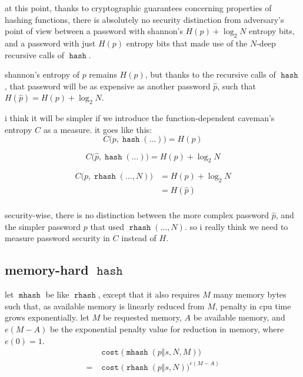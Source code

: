 \documentclass[twocolumn]{article}
\DeclareMathOperator{\hash}{\mathtt{hash}}
\DeclareMathOperator{\rhash}{\mathtt{rhash}}
\DeclareMathOperator{\mhash}{\mathtt{mhash}}
\DeclareMathOperator{\cost}{\mathtt{cost}}
\begin{document}
at this point, thanks to cryptographic guarantees concerning properties of
hashing functions, there is absolutely no security distinction from
adversary's point of view between a password with shannon's $H(p) + \log_2
N$ entropy bits, and a password with just $H(p)$ entropy bits that made use
of the $N$-deep recursive calls of $\hash$.

shannon's entropy of $p$ remains $H(p)$, but thanks to the recursive calls
of $\hash$, that password will be as expensive as another password $\hat
p$, such that $H(\hat p) = H(p) + \log_2 N$.

i think it will be simpler if we introduce the function-dependent caveman's
entropy $C$ as a measure.  it goes like this:
\begin{equation}
    C\Big(p, \hash(\ldots)\Big) = H(p)
\end{equation}

\begin{equation}
    C\Big(\hat p, \hash(\ldots)\Big) = H(p) + \log_2 N
\end{equation}

\begin{equation}
    \begin{split}
        C\Big(p, \rhash(\ldots, N)\Big) &= H(p) + \log_2 N \\
                                &= H(\hat p) \\
    \end{split}
\end{equation}

security-wise, there is no distinction between the more complex password
$\hat p$, and the simpler password $p$ that used $\rhash(\ldots, N)$.  so i
really think we need to measure password security in $C$ instead of $H$.

\subsection{memory-hard $\hash$}
let $\mhash$ be like $\rhash$, except that it also requires $M$ many memory
bytes such that, as available memory is linearly reduced from $M$, penalty
in cpu time grows exponentially.  let $M$ be requested memory, $A$ be
available memory, and $e(M - A)$ be the exponential penalty value for
reduction in memory, where $e(0) = 1$.
\begin{equation}
    \begin{split}
        & \cost\Big(\mhash(p \Vert s, N, M)\Big) \\
    ={} & \cost\Big(\rhash(p \Vert s, N)\Big)^{e(M-A)}
    \end{split}
\end{equation}
\end{document}
